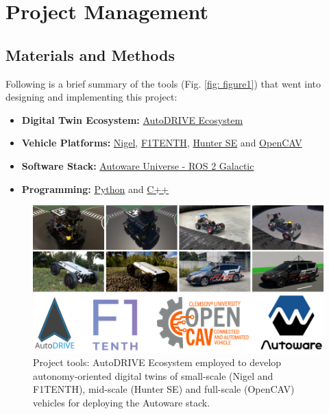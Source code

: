 \hypertarget{Project Management}{%
\section{Project Management}\label{Project Management}}

\hypertarget{Materials and Methods}{%
\subsection{Materials and Methods}\label{Materials and Methods}}

Following is a brief summary of the tools (Fig. \ref{fig: figure1}) that went into designing and implementing this project:

\begin{itemize}
    \item \textbf{Digital Twin Ecosystem:} \href{https://autodrive-ecosystem.github.io}{AutoDRIVE Ecosystem}
    \item \textbf{Vehicle Platforms:} \href{https://youtu.be/YFQzyfXV6Rw?feature=shared}{Nigel}, \href{https://youtu.be/Rq7Wwcwn1uk?si=_ODExkHBopsQszrU}{F1TENTH}, \href{https://global.agilex.ai/chassis/9}{Hunter SE} and \href{https://youtu.be/YIZz_8rLgZQ?si=6Z6LWxWSTyS3Uk8u}{OpenCAV}
    \item \textbf{Software Stack:} \href{https://github.com/autowarefoundation/autoware.universe/tree/galactic}{Autoware Universe - ROS 2 Galactic}
    \item \textbf{Programming:} \href{https://www.python.org}{Python} and \href{https://isocpp.org}{C++}
\end{itemize}

\begin{figure}[htpb]
    \centering
    \includegraphics[width=\linewidth]{Figures/fig2.png}
    \caption{Project tools: AutoDRIVE Ecosystem employed to develop autonomy-oriented digital twins of small-scale (Nigel and F1TENTH), mid-scale (Hunter SE) and full-scale (OpenCAV) vehicles for deploying the Autoware stack.}
    \label{fig: figure2}
\end{figure}

